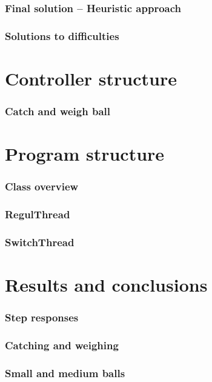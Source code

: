 \documentclass[
compress]
{beamer}
\begin{document}
\begin{frame}
\frametitle{Final solution -- Heuristic approach}

\end{frame}

\begin{frame}
\frametitle{Solutions to difficulties}

\end{frame}

\section{Controller structure}
\begin{frame}
\end{frame}

\begin{frame}
\frametitle{Catch and weigh ball}

\end{frame}

\section{Program structure}
\begin{frame}
\frametitle{Class overview}

\end{frame}

\begin{frame}
\frametitle{RegulThread}

\end{frame}

\begin{frame}
\frametitle{SwitchThread}

\end{frame}

\section{Results and conclusions}
\begin{frame}
\frametitle{Step responses}

\end{frame}

\begin{frame}
\frametitle{Catching and weighing}

\end{frame}

\begin{frame}
\frametitle{Small and medium balls}

\end{frame}
\end{document}
